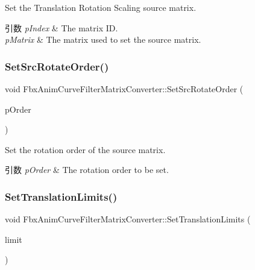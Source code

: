 Set the Translation Rotation Scaling source matrix. 
\begin{DoxyParams}{引数}
{\em p\+Index} & The matrix ID. \\
\hline
{\em p\+Matrix} & The matrix used to set the source matrix. \\
\hline
\end{DoxyParams}
\mbox{\label{class_fbx_anim_curve_filter_matrix_converter_a7140e4dce0bf5ef87d75991fa5eb315e}} 
\subsubsection{\texorpdfstring{Set\+Src\+Rotate\+Order()}{SetSrcRotateOrder()}}
{\footnotesize\ttfamily void Fbx\+Anim\+Curve\+Filter\+Matrix\+Converter\+::\+Set\+Src\+Rotate\+Order (\begin{DoxyParamCaption}\item[{\hyperlink{class_fbx_euler_a7d5bec7eedb022b4dae56894ab7a9939}{Fbx\+Euler\+::\+E\+Order}}]{p\+Order }\end{DoxyParamCaption})}

Set the rotation order of the source matrix. 
\begin{DoxyParams}{引数}
{\em p\+Order} & The rotation order to be set. \\
\hline
\end{DoxyParams}
\mbox{\label{class_fbx_anim_curve_filter_matrix_converter_a892ade0f0e5b7451a6e09da5ee4179bf}} 
\subsubsection{\texorpdfstring{Set\+Translation\+Limits()}{SetTranslationLimits()}}
{\footnotesize\ttfamily void Fbx\+Anim\+Curve\+Filter\+Matrix\+Converter\+::\+Set\+Translation\+Limits (\begin{DoxyParamCaption}\item[{\hyperlink{class_fbx_limits}{Fbx\+Limits} \&}]{limit }\end{DoxyParamCaption})}

